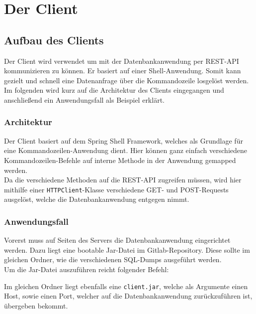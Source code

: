 \chapter{Der Client}
\label{Client}


\section{Aufbau des Clients}

Der Client wird verwendet um mit der Datenbankanwendung per REST-API kommunizieren zu können. Er basiert auf einer Shell-Anwendung. Somit kann gezielt und schnell eine Datenanfrage über die Kommandozeile losgelöst werden.
Im folgenden wird kurz auf die Architektur des Clients eingegangen und anschließend ein Anwendungsfall als Beispiel erklärt.

\subsection{Architektur}

Der Client basiert auf dem Spring Shell Framework, welches als Grundlage für eine Kommandozeilen-Anwendung dient. \cite{Spring:SpringShell}
Hier können ganz einfach verschiedene Kommandozeilen-Befehle auf interne Methode in der Anwendung gemapped werden.\\

Da die verschiedene Methoden auf die REST-API zugreifen müssen, wird hier mithilfe einer \texttt{HTTPClient}-Klasse verschiedene GET- und POST-Requests ausgelöst, welche die Datenbankanwendung entgegen nimmt.


\subsection{Anwendungsfall}

Vorerst muss auf Seiten des Servers die Datenbankanwendung eingerichtet werden. Dazu liegt eine bootable Jar-Datei im Gitlab-Repository. Diese sollte im gleichen Ordner, wie die verschiedenen SQL-Dumps ausgeführt werden.\\
Um die Jar-Datei auszuführen reicht folgender Befehl:

\begin{center}
\end{center}

Im gleichen Ordner liegt ebenfalls eine \texttt{client.jar}, welche als Argumente einen Host, sowie einen Port, welcher auf die Datenbankanwendung zurückzuführen ist, übergeben bekommt.

